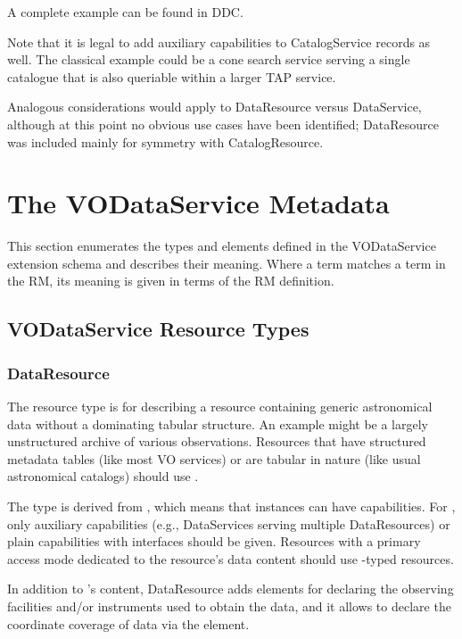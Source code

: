 \documentclass[11pt,a4paper]{ivoa}
\begin{document}
A complete example can be found in DDC.

Note that it is legal to add auxiliary capabilities to CatalogService
records as well.  The classical example could be a cone search service
serving a single catalogue that is also queriable within a larger TAP
service.

Analogous considerations would apply to DataResource versus DataService,
although at this point no obvious use cases have been identified;
DataResource was included mainly for symmetry with CatalogResource.

\section{The VODataService Metadata}
\label{sect:metadata}


This section enumerates the types and elements defined in the
VODataService extension schema and describes their meaning.  Where a
term matches a term in the RM, its meaning is given
in terms of the RM definition.  


\subsection{VODataService Resource Types}
\label{sect:resext}

\subsubsection{DataResource}
\label{sect:DataResource}

The  resource type is for describing a
resource containing generic astronomical data without a dominating
tabular structure.  An example might be a largely unstructured archive
of various observations.  Resources that have structured metadata tables
(like most VO services) or are tabular in nature (like usual
astronomical catalogs) should use .

The type is derived from , which means that instances
can have
capabilities.  For , only auxiliary capabilities
(e.g., DataServices serving multiple DataResources) or plain capabilities
with  interfaces should be given.  Resources with a
primary access mode dedicated to the resource's data content should use
-typed resources.

In addition to 's content, DataResource adds
elements for declaring the observing facilities and/or instruments used
to obtain the data, and it allows to declare
the coordinate coverage of data via the 
element.
\end{document}
